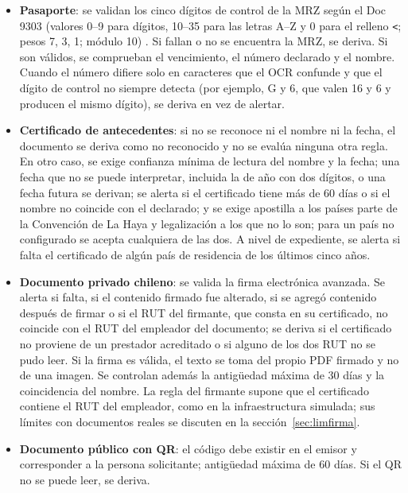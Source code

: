 \documentclass[11pt,a4paper]{article}
\begin{document}
\begin{itemize}
  \item \textbf{Pasaporte}: se validan los cinco dígitos de control de la MRZ según el Doc 9303 (valores 0--9 para dígitos, 10--35 para las letras A--Z y 0 para el relleno \texttt{<}; pesos 7, 3, 1; módulo 10) \cite{icao9303}. Si fallan o no se encuentra la MRZ, se deriva. Si son válidos, se comprueban el vencimiento, el número declarado y el nombre. Cuando el número difiere solo en caracteres que el OCR confunde y que el dígito de control no siempre detecta (por ejemplo, G y 6, que valen 16 y 6 y producen el mismo dígito), se deriva en vez de alertar.
  \item \textbf{Certificado de antecedentes}: si no se reconoce ni el nombre ni la fecha, el documento se deriva como no reconocido y no se evalúa ninguna otra regla. En otro caso, se exige confianza mínima de lectura del nombre y la fecha; una fecha que no se puede interpretar, incluida la de año con dos dígitos, o una fecha futura se derivan; se alerta si el certificado tiene más de 60 días o si el nombre no coincide con el declarado; y se exige apostilla a los países parte de la Convención de La Haya y legalización a los que no lo son; para un país no configurado se acepta cualquiera de las dos. A nivel de expediente, se alerta si falta el certificado de algún país de residencia de los últimos cinco años.
  \item \textbf{Documento privado chileno}: se valida la firma electrónica avanzada. Se alerta si falta, si el contenido firmado fue alterado, si se agregó contenido después de firmar o si el RUT del firmante, que consta en su certificado, no coincide con el RUT del empleador del documento; se deriva si el certificado no proviene de un prestador acreditado o si alguno de los dos RUT no se pudo leer. Si la firma es válida, el texto se toma del propio PDF firmado y no de una imagen. Se controlan además la antigüedad máxima de 30 días y la coincidencia del nombre. La regla del firmante supone que el certificado contiene el RUT del empleador, como en la infraestructura simulada; sus límites con documentos reales se discuten en la sección~\ref{sec:limfirma}.
  \item \textbf{Documento público con QR}: el código debe existir en el emisor y corresponder a la persona solicitante; antigüedad máxima de 60 días. Si el QR no se puede leer, se deriva.
\end{itemize}
\end{document}
